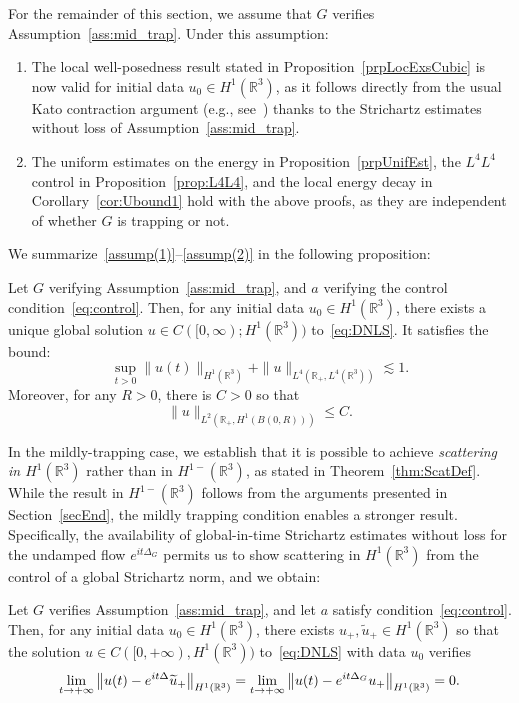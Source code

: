 \documentclass[AHL,Unicode,longabstracts,published]{cedram}
\newcommand*\R{\mathbb{R}}
\renewcommand*{\to}{\mathchoice{\longrightarrow}{\rightarrow}{\rightarrow}{\rightarrow}}
\begin{document}
For the remainder of this section, we assume that $G$ verifies Assumption~\ref{ass:mid_trap}. Under this assumption:
\begin{enumerate}
\item\label{assump(1)} The {local well-posedness result} stated in Proposition~\ref{prpLocExsCubic} is now valid for initial data $u_0 \in H^1(\R^3) $, as it follows directly from the usual Kato contraction argument (e.g., see~\cite{Ca03}) thanks to the Strichartz estimates without loss of Assumption~\ref{ass:mid_trap}.

\item\label{assump(2)} The uniform estimates on the energy in Proposition~\ref{prpUnifEst}, the $L^4L^4$ control in Proposition~\ref{prop:L4L4}, and the local energy decay in Corollary~\ref{cor:Ubound1} hold with the above proofs, as they are independent of whether $G$ is trapping or not.
\end{enumerate}
We summarize~\eqref{assump(1)}--\eqref{assump(2)} in the following proposition:
\begin{prop}
Let $G$ verifying Assumption~\ref{ass:mid_trap}, and $a$ verifying the control condition~\eqref{eq:control}. Then, for any initial data $u_0 \in H^1(\R^3) $, there exists a unique global solution $u \in C([0, \infty); H^1(\R^3)) $ to~\eqref{eq:DNLS}. It satisfies the bound:
\begin{equation}\label{eqH1L4Cont}
\sup_{t > 0} \| u(t) \|_{H^1(\R^3)} + \| u \|_{L^4\left(\R_+, L^4(\R^3)\right)} \lesssim 1.
\end{equation}
Moreover, for any $R>0$, there is $C>0$ so that
\begin{equation*}
\| u \|_{L^2\left(\R_+, H^1(B(0,R))\right)} \leq C.
\end{equation*}
\end{prop}

In the mildly-trapping case, we establish that it is possible to achieve \emph{scattering in $H^1(\R^3) $} rather than in $H^{1-}(\R^3) $, as stated in Theorem~\ref{thm:ScatDef}. While the result in $H^{1-}(\R^3) $ follows from the arguments presented in Section~\ref{secEnd}, the mildly trapping condition enables a stronger result. Specifically, the availability of global-in-time Strichartz estimates without loss for the undamped flow $e^{it\Delta_G}$ permits us to show scattering in $H^1(\R ^3)$ from the control of a global Strichartz norm, and we obtain:

\begin{theo} \label{th:mid_trapp}
Let $G$ verifies Assumption~\ref{ass:mid_trap}, and let $a$ satisfy condition~\eqref{eq:control}. Then, for any initial data $u_0 \in H^1(\R^3) $, there exists $u_+, \widetilde u_+ \in H^1(\R^3)$ so that the solution $u \in C([0, +\infty), H^1(\R ^3))$ to~\eqref{eq:DNLS} with data $u_0$ verifies
\[
\lim_{t \to +\infty}\left\| u(t) - e^{it\Delta} \widetilde u_+ \right\|_{H^1(\R ^3)} =
\lim_{t \to +\infty}\left\| u(t) - e^{it\Delta_G} u_+ \right\|_{H^1(\R ^3)} = 0.
\]
\end{theo}
\end{document}
